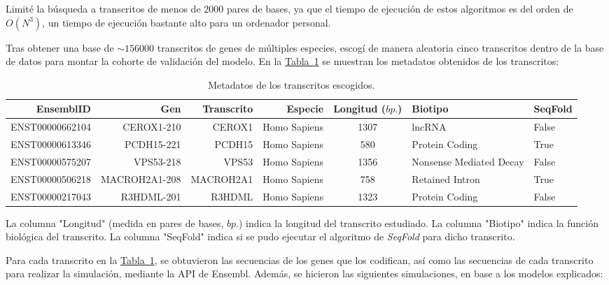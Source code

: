 \documentclass[a4paper,11pt,titlepage]{article}
\newcommand{\nr}[2][sección]{\hyperref[#2]{#1~\ref{#2}}}
\theoremstyle{definition}
\begin{document}
Limité la búsqueda a transcritos de menos de 2000 pares de bases, ya que el tiempo de ejecución de estos algoritmos es del orden de $O(N^3)$, un tiempo de ejecución bastante alto para un ordenador personal.

Tras obtener una base de $\sim156000$ transcritos de genes de múltiples especies, escogí de manera aleatoria cinco transcritos dentro de la base de datos para montar la cohorte de validación del modelo. En la \nr[Tabla]{tab:transcripts} se muestran los metadatos obtenidos de los transcritos:

\begin{table}[H]
	\centering
    \begin{adjustbox}{width=\textwidth}
	\begin{tabular}{rrrrcll}
	    \toprule
        EnsemblID & Gen & Transcrito & Especie & Longitud ($bp.$) & Biotipo & SeqFold \\
		\midrule
        ENST00000662104 & CEROX1-210 & CEROX1 & Homo Sapiens & 1307 & lncRNA & False \\
        ENST00000613346 & PCDH15-221 & PCDH15 & Homo Sapiens & 580 & Protein Coding  & True \\
        ENST00000575207 & VPS53-218 & VPS53 & Homo Sapiens & 1356 & Nonsense Mediated Decay & False \\
        ENST00000506218 & MACROH2A1-208 & MACROH2A1 & Homo Sapiens & 758 & Retained Intron & True \\
        ENST00000217043 & R3HDML-201 & R3HDML & Homo Sapiens & 1323 & Protein Coding & False \\
		\bottomrule
	\end{tabular}
    \end{adjustbox}
	\caption{Metadatos de los transcritos escogidos.}
    \label{tab:transcripts}
\end{table}

La columna "Longitud" (medida en pares de bases, $bp.$) indica la longitud del transcrito estudiado. La columna "Biotipo" indica la función biológica del transcrito. La columna "SeqFold" indica si se pudo ejecutar el algoritmo de \textit{SeqFold} para dicho transcrito.

Para cada transcrito en la \nr[Tabla]{tab:transcripts}, se obtuvieron las secuencias de los genes que los codifican, así como las secuencias de cada transcrito para realizar la simulación, mediante la API de Ensembl. Además, se hicieron las siguientes simulaciones, en base a los modelos explicados: 
\end{document}
